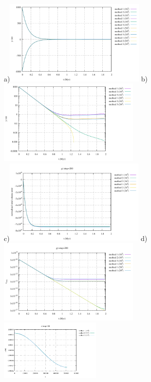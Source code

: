 \begin{center}
a)\includegraphics[width=7cm]{python_codes/fieldstone_54/images/elevation.pdf}
b)\includegraphics[width=7cm]{python_codes/fieldstone_54/images/elevation_log.pdf}\\
c)\includegraphics[width=7cm]{python_codes/fieldstone_54/images/volume.pdf}
d)\includegraphics[width=7cm]{python_codes/fieldstone_54/images/vrms.pdf}\\
\includegraphics[width=5cm]{python_codes/fieldstone_54/images/surface_topography_050.pdf}

\end{center}
